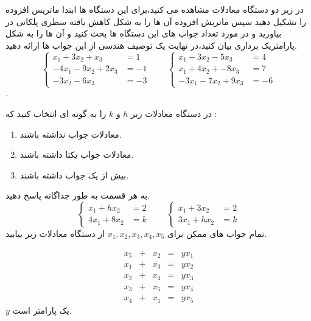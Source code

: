 \documentclass{article}
\begin{document}


در زیر دو دستگاه معادلات مشاهده می کنید،برای این دستگاه ها ابتدا ماتریس افزوده را تشکیل دهید سپس ماتریش افزوده آن ها را به شکل کاهش یافته سطری پلکانی در بیاورید و در مورد تعداد جواب های این دستگاه ها بحث کنید و آن ها را به شکل پارامتریک برداری بیان کنید،در نهایت یک توصیف هندسی از این جواب ها ارائه دهید.
\begin{equation*}
\left\{
\begin{array}{rl}
 x_1+3x_2+x_3&=1\\
-4x_1-9x_2+2x_3&=-1\\
-3x_2-6x_3&=-3
\end{array} \right.\qquad
\left\{
\begin{array}{rl}
 x_1+3x_2-5x_3&=4\\
x_1+4x_2+-8x_3&=7\\
-3x_1-7x_2+9x_3&=-6
\end{array} \right.
\end{equation*}
.



در دستگاه معادلات زیر 
$h$
و 
$k$
را به گونه ای انتخاب کنید که :
\begin{enumerate}
\item
معادلات جواب نداشته باشند.
\item 
معادلات جواب یکتا داشته باشند.
\item 
بیش از یک جواب داشته باشند.

\end{enumerate}
به هر قسمت به طور جداگانه پاسخ دهید.
\begin{equation*}
\left\{
\begin{array}{rl}
x_1+hx_2&=2\\
4x_1+8x_2&=k
\end{array} \right.\qquad
\left\{
\begin{array}{rl}
x_1+3x_2&=2\\
3x_1+hx_2&=k
\end{array} \right.
\end{equation*}
تمام جواب های ممکن برای 
$x_1,x_2,x_3,x_4,x_5$
از دستگاه معادلات زیر بیابید.

$$\begin{array}{ccccc}
x_5&+&x_2&=&yx_1\\
x_1&+&x_3&=&yx_2\\
x_2&+&x_4&=&yx_3\\
x_3&+&x_5&=&yx_4\\
x_4&+&x_1&=&yx_5
\end{array}$$
$y$
یک پارامتر است.
\end{document}
